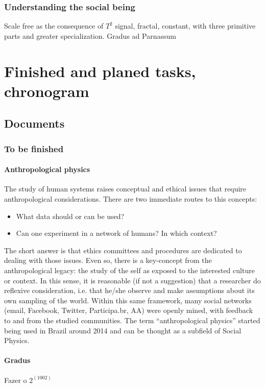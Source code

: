 \documentclass[a4paper,openright,12pt]{report} %
\begin{document}
\subsection{Understanding the social being}
Scale free as the consequence of $T^2$ signal, fractal, constant, with three primitive parts and greater specialization. Gradus ad Parnassum

\chapter{Finished and planed tasks, chronogram}
\section{Documents}
\subsection{To be finished}
\subsubsection{Anthropological physics}
The study of human systems raises conceptual
and ethical issues that require anthropological considerations.
There are two immediate routes to this concepts:
\begin{itemize}
	\item What data should or can be used?
	\item Can one experiment in a network of humans? In which context?
\end{itemize}

The short answer is that ethics committees and procedures are dedicated to dealing with those issues.
Even so, there is a key-concept from the anthropological legacy: the study of the self as exposed to the interested culture or context. 
In this sense, it is reasonable (if not a suggestion) that
a researcher do reflexive consideration, 
i.e. that he/she observe and make assumptions about its own sampling of the world.
Within this same framework, many social networks (email, Facebook, Twitter, Participa.br, AA) were openly mined,
with feedback to and from the studied communities.
The term ``anthropological physics'' started being used in Brazil around
2014 and can be thought as a subfield of Social Physics.

\subsubsection{Gradus}
Fazer o $2^(100 2)$
\end{document}
